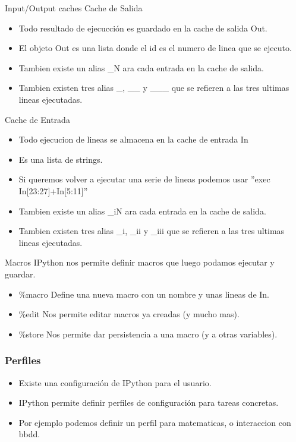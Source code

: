 \documentclass[10pt]{beamer}
\begin{document}
  \begin{frame}{Input/Output caches}
    Cache de Salida
    \begin{itemize}
      \item Todo resultado de ejecucción es guardado en la cache de salida Out.
      \item El objeto Out es una lista donde el id es el numero de linea que se ejecuto.
      \item Tambien existe un alias \_N ara cada entrada en la cache de salida.
      \item Tambien existen tres alias \_, \_\_ y \_\_\_  que se refieren a las tres ultimas lineas ejecutadas.
    \end{itemize}

    Cache de Entrada
    \begin{itemize}
      \item Todo ejecucion de lineas se almacena en la cache de entrada In
      \item Es una lista de strings.
      \item Si queremos volver a ejecutar una serie de lineas podemos usar ''exec In[23:27]+In[5:11]''
      \item Tambien existe un alias \_iN ara cada entrada en la cache de salida.
      \item Tambien existen tres alias \_i, \_ii y \_iii  que se refieren a las tres ultimas lineas ejecutadas.
    \end{itemize}
  \end{frame}

  \begin{frame}{Macros}
    IPython nos permite definir macros que luego podamos ejecutar y guardar.
    \begin{itemize}
      \item \%macro Define una nueva macro con un nombre y unas lineas de In.
      \item \%edit Nos permite editar macros ya creadas (y mucho mas).
      \item \%store Nos permite dar persistencia a una macro (y a otras variables).
    \end{itemize}
  \end{frame}

  \begin{frame}
    \frametitle{Perfiles}
    \begin{itemize}
      \item Existe una configuración de IPython para el usuario.
      \item IPython permite definir perfiles de configuración para tareas concretas.
      \item Por ejemplo podemos definir un perfil para matematicas, o interaccion con bbdd.
    \end{itemize}
  \end{frame}
\end{document}
